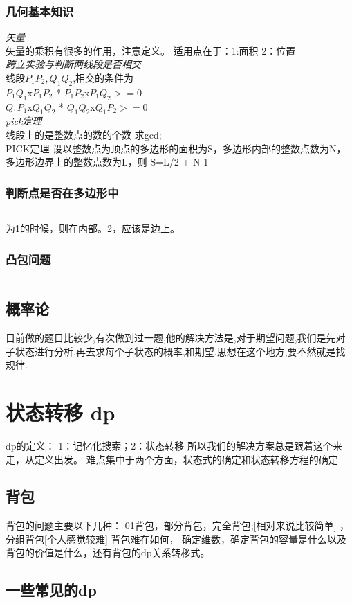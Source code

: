 \documentclass[a4paper,11pt]{article}
\begin{document}
\begin{CJK}{UTF8}{gbsn}
\subsubsection{几何基本知识}
\emph{矢量}\\
矢量的乘积有很多的作用，注意定义。
适用点在于：1:面积 2：位置\\
\emph{跨立实验与判断两线段是否相交}\\
线段$P_1P_2,Q_1Q_2$,相交的条件为\\
$P_1Q_1$x$P_1P_2$  *  $P_1P_2$x$P_1Q_2>=0$\\
$Q_1P_1$x$Q_1Q_2$  *  $Q_1Q_2$x$Q_1P_2>=0$\\
\emph{pick定理}\\
线段上的是整数点的数的个数 求gcd;\\
PICK定理 设以整数点为顶点的多边形的面积为S，多边形内部的整数点数为N，多边形边界上的整数点数为L，则 S=L/2 + N-1

\subsubsection{判断点是否在多边形中}
\inputminted{c++}{../scoure/math/jihe.cpp}
为1的时候，则在内部。2，应该是边上。
\subsubsection{凸包问题}
\inputminted{c++}{../scoure/math/tubao.cpp}
\subsection{概率论}
目前做的题目比较少,有次做到过一题,他的解决方法是,对于期望问题,我们是先对子状态进行分析,再去求每个子状态的概率,和期望.思想在这个地方,要不然就是找规律.
\section{状态转移 dp}
dp的定义：
1：记忆化搜索；2：状态转移
所以我们的解决方案总是跟着这个来走，从定义出发。
难点集中于两个方面，状态式的确定和状态转移方程的确定
\subsection{背包}
背包的问题主要以下几种：
01背包，部分背包，完全背包;[相对来说比较简单] ，分组背包[个人感觉较难]
背包难在如何， 确定维数，确定背包的容量是什么以及背包的价值是什么，还有背包的dp关系转移式。
\subsection{一些常见的dp}

\end{CJK}
\end{document}
